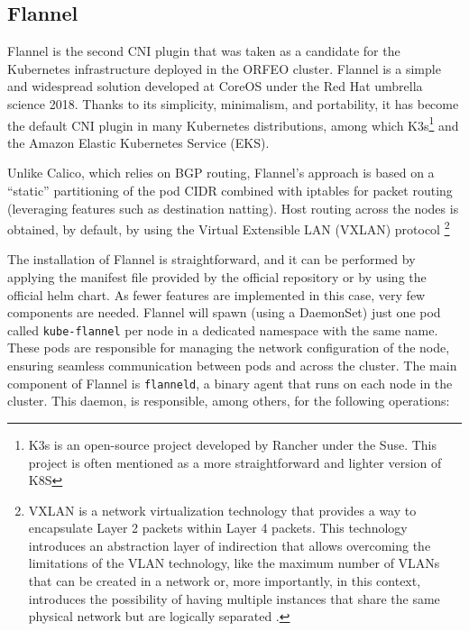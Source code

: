 \subsection{Flannel}\label{subsec:flannel}

Flannel is the second CNI plugin that was taken as a candidate for the
Kubernetes infrastructure deployed in the ORFEO cluster. Flannel is a simple and
widespread solution developed at CoreOS under the Red Hat umbrella science 2018.
Thanks to its simplicity, minimalism, and portability, it has become the default
CNI plugin in many Kubernetes distributions, among which K3s\footnote{K3s is an
open-source project developed by Rancher under the Suse. This project is often
mentioned as a more straightforward and lighter version of K8S} and the Amazon
Elastic Kubernetes Service (EKS).

Unlike Calico, which relies on BGP routing, Flannel's approach is based on a
``static'' partitioning of the pod CIDR combined with iptables for packet
routing (leveraging features such as destination natting). Host routing across
the nodes is obtained, by default, by using the Virtual Extensible LAN (VXLAN)
protocol \cite{flannel-github}\footnote{VXLAN is a network virtualization
technology that provides a way to encapsulate Layer 2 packets within Layer 4
packets. This technology introduces an abstraction layer of indirection that
allows overcoming the limitations of the VLAN technology, like the maximum
number of VLANs that can be created in a network or, more importantly, in this
context, introduces the possibility of having multiple instances that share the
same physical network but are logically separated \cite{VXLANnistdef}.}

The installation of Flannel is straightforward, and it can be performed by
applying the manifest file provided by the official repository or by using the
official helm chart.
As fewer features are implemented in this case, very few components are needed.
Flannel will spawn (using a DaemonSet) just one pod called \texttt{kube-flannel}
per node in a dedicated namespace with the same name.
These pods are responsible for managing the network configuration of the node,
ensuring seamless communication between pods and across the cluster.
The main component of Flannel is \texttt{flanneld}, a binary agent that runs on each
node in the cluster.
This daemon, is responsible, among others, for the following operations:

